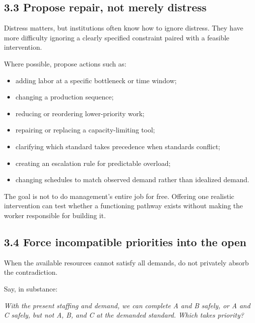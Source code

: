 \documentclass[11pt,oneside]{article}
\providecommand{\tightlist}{%
  \setlength{\itemsep}{0.22em}\setlength{\parskip}{0pt}}
\renewenvironment{quote}
  {\begin{tcolorbox}[
      enhanced,
      breakable,
      colback=ManifestLight,
      colframe=ManifestRule,
      boxrule=0pt,
      leftrule=3pt,
      arc=0pt,
      outer arc=0pt,
      left=10pt,right=10pt,top=8pt,bottom=8pt,
      before skip=0.8em,after skip=0.8em
    ]\itshape}
  {\end{tcolorbox}}
\begin{document}
\hypertarget{propose-repair-not-merely-distress}{%
\subsection{3.3 Propose repair, not merely
distress}\label{propose-repair-not-merely-distress}}

Distress matters, but institutions often know how to ignore distress.
They have more difficulty ignoring a clearly specified constraint paired
with a feasible intervention.

Where possible, propose actions such as:

\begin{itemize}
\tightlist
\item
  adding labor at a specific bottleneck or time window;
\item
  changing a production sequence;
\item
  reducing or reordering lower-priority work;
\item
  repairing or replacing a capacity-limiting tool;
\item
  clarifying which standard takes precedence when standards conflict;
\item
  creating an escalation rule for predictable overload;
\item
  changing schedules to match observed demand rather than idealized
  demand.
\end{itemize}

The goal is not to do management's entire job for free. Offering one
realistic intervention can test whether a functioning pathway exists
without making the worker responsible for building it.

\hypertarget{force-incompatible-priorities-into-the-open}{%
\subsection{3.4 Force incompatible priorities into the
open}\label{force-incompatible-priorities-into-the-open}}

When the available resources cannot satisfy all demands, do not
privately absorb the contradiction.

Say, in substance:

\begin{quote}
With the present staffing and demand, we can complete A and B safely, or
A and C safely, but not A, B, and C at the demanded standard. Which
takes priority?
\end{quote}
\end{document}
